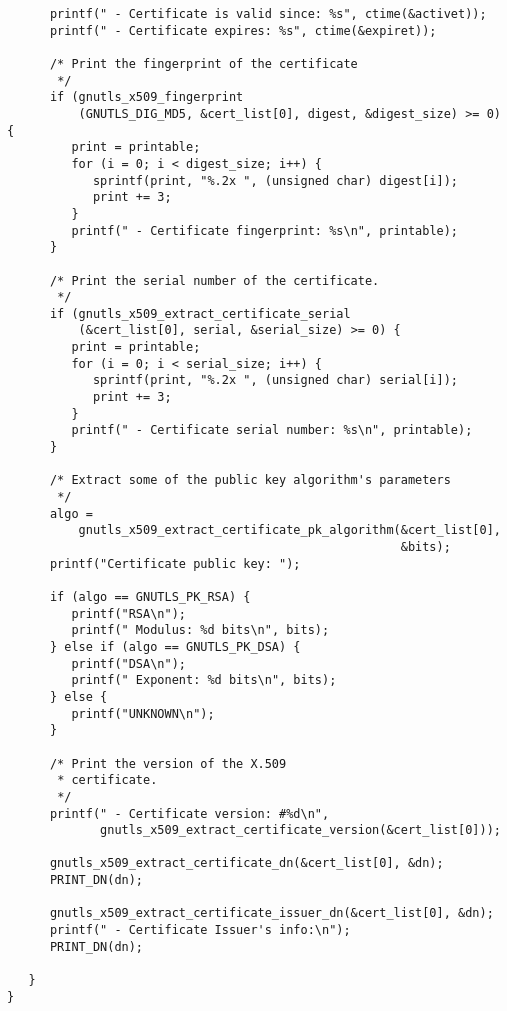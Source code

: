 \begin{verbatim}
      printf(" - Certificate is valid since: %s", ctime(&activet));
      printf(" - Certificate expires: %s", ctime(&expiret));

      /* Print the fingerprint of the certificate
       */
      if (gnutls_x509_fingerprint
          (GNUTLS_DIG_MD5, &cert_list[0], digest, &digest_size) >= 0) {
         print = printable;
         for (i = 0; i < digest_size; i++) {
            sprintf(print, "%.2x ", (unsigned char) digest[i]);
            print += 3;
         }
         printf(" - Certificate fingerprint: %s\n", printable);
      }

      /* Print the serial number of the certificate.
       */
      if (gnutls_x509_extract_certificate_serial
          (&cert_list[0], serial, &serial_size) >= 0) {
         print = printable;
         for (i = 0; i < serial_size; i++) {
            sprintf(print, "%.2x ", (unsigned char) serial[i]);
            print += 3;
         }
         printf(" - Certificate serial number: %s\n", printable);
      }

      /* Extract some of the public key algorithm's parameters
       */
      algo =
          gnutls_x509_extract_certificate_pk_algorithm(&cert_list[0],
                                                       &bits);
      printf("Certificate public key: ");

      if (algo == GNUTLS_PK_RSA) {
         printf("RSA\n");
         printf(" Modulus: %d bits\n", bits);
      } else if (algo == GNUTLS_PK_DSA) {
         printf("DSA\n");
         printf(" Exponent: %d bits\n", bits);
      } else {
         printf("UNKNOWN\n");
      }

      /* Print the version of the X.509 
       * certificate.
       */
      printf(" - Certificate version: #%d\n",
             gnutls_x509_extract_certificate_version(&cert_list[0]));

      gnutls_x509_extract_certificate_dn(&cert_list[0], &dn);
      PRINT_DN(dn);

      gnutls_x509_extract_certificate_issuer_dn(&cert_list[0], &dn);
      printf(" - Certificate Issuer's info:\n");
      PRINT_DN(dn);

   }
}

\end{verbatim}
